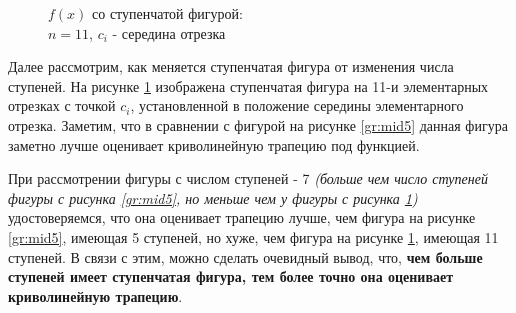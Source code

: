 \documentclass[12pt, a4paper]{article}
\begin{document}
\begin{figure}[H]
\caption{$f(x)$ со ступенчатой фигурой:\\ $n = 11$, $c_i$ - середина отрезка}
\label{gr:mid11}
\end{figure}

Далее рассмотрим, как меняется ступенчатая фигура от изменения числа ступеней. На рисунке \ref{gr:mid11} изображена ступенчатая фигура на 11-и элементарных отрезках с точкой $c_i$, установленной в положение середины элементарного отрезка. Заметим, что в сравнении с фигурой на рисунке \ref{gr:mid5} данная фигура заметно лучше оценивает криволинейную трапецию под функцией.

При рассмотрении фигуры с числом ступеней - 7 \textit{(больше чем число ступеней фигуры с рисунка \ref{gr:mid5}, но меньше чем у фигуры с рисунка \ref{gr:mid11})} удостоверяемся, что она оценивает трапецию лучше, чем фигура на рисунке \ref{gr:mid5}, имеющая 5 ступеней, но хуже, чем фигура на рисунке \ref{gr:mid11}, имеющая 11 ступеней. В связи с этим, можно сделать очевидный вывод, что, \textbf{чем больше ступеней имеет ступенчатая фигура, тем более точно она оценивает криволинейную трапецию}.
\end{document}
